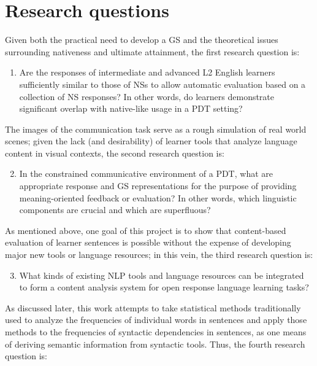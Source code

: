 \documentclass[11pt]{article}
\begin{document}
\section{Research questions}
Given both the practical need to develop a GS and the theoretical issues surrounding nativeness and ultimate attainment, the first research question is:

\begin{enumerate}
\item{Are the responses of intermediate and advanced L2 English learners sufficiently similar to those of NSs to allow automatic evaluation based on a collection of NS responses? In other words, do learners demonstrate significant overlap with native-like usage in a PDT setting?} %
\end{enumerate}
The images of the communication task serve as a rough simulation of real world scenes; given the lack (and desirability) of learner tools that analyze language content in visual contexts, the second research question is:

\begin{enumerate}\setcounter{enumi}{1}
\item{In the constrained communicative environment of a PDT, what are appropriate response and GS representations for the purpose of providing meaning-oriented feedback or evaluation? In other words, which linguistic components are crucial and which are superfluous?}
\end{enumerate}
As mentioned above, one goal of this project is to show that content-based evaluation of learner sentences is possible without the expense of developing major new tools or language resources; in this vein, the third research question is: 

\begin{enumerate}\setcounter{enumi}{2}
\item{What kinds of existing NLP tools and language resources can be integrated to form a content analysis system for open response language learning tasks?}
\end{enumerate}
As discussed later, this work attempts to take statistical methods traditionally used to analyze the frequencies of individual words in sentences and apply those methods to the frequencies of syntactic dependencies in sentences, as one means of deriving semantic information from syntactic tools. Thus, the fourth research question is:
\end{document}
